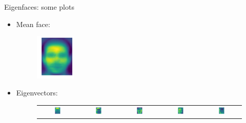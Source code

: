 \bgroup
\begin{frame}{Eigenfaces: some plots}
\begin{itemize}
\item Mean face:
\begin{figure}
\includegraphics[width=0.18\textwidth]{img/eigenfaces/mean.pdf}
\end{figure}
\item Eigenvectors:
\setlength{\tabcolsep}{.07em}
\begin{figure}
\begin{tabular}{ccccc}
\includegraphics[width=0.18\textwidth]{img/eigenfaces/0.pdf}&
\includegraphics[width=0.18\textwidth]{img/eigenfaces/1.pdf}&
\includegraphics[width=0.18\textwidth]{img/eigenfaces/2.pdf}&
\includegraphics[width=0.18\textwidth]{img/eigenfaces/3.pdf}&
\includegraphics[width=0.18\textwidth]{img/eigenfaces/4.pdf}
\end{tabular}
\end{figure}
\end{itemize}
\end{frame}
\egroup